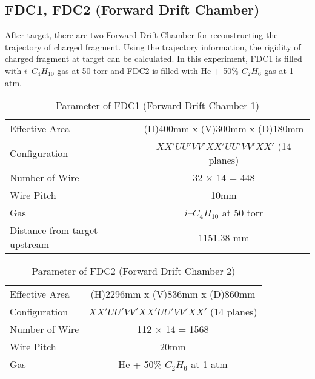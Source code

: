 \subsection{FDC1, FDC2 (Forward Drift Chamber)}
After target, there are two Forward Drift Chamber for reconstructing the trajectory of charged fragment. Using the trajectory information, the rigidity of charged fragment at target can be calculated. In this experiment, FDC1 is filled with $i$--${C}_{4} {H}_{10}$ gas at 50 torr and FDC2 is filled with He + 50\% ${C}_{2} {H}_{6}$ gas at 1 atm. 

\begin{table}[h]
    \centering
    \begin{tabular}{l|c}
        \hline
        Effective Area & (H)400mm x (V)300mm x (D)180mm\\
        Configuration & $XX'UU'VV'XX'UU'VV'XX'$ (14 planes)\\
        Number of Wire & 32 $\times$ 14 = 448 \\
        Wire Pitch & 10mm \\
        Gas & $i$--${C}_{4} {H}_{10}$ at 50 torr\\
        Distance from target upstream & 1151.38 mm  \\
        \hline
    \end{tabular}
    \caption{Parameter of FDC1 (Forward Drift Chamber 1) \cite{SAMURAI}}
\end{table}

\begin{table}[h]
    \centering
    \begin{tabular}{l|c}
        \hline
        Effective Area & (H)2296mm x (V)836mm x (D)860mm\\
        Configuration & $XX'UU'VV'XX'UU'VV'XX'$ (14 planes)\\
        Number of Wire & 112 $\times$ 14 = 1568 \\
        Wire Pitch & 20mm \\
        Gas & He + 50\% ${C}_{2} {H}_{6}$ at 1 atm\\
        \hline
    \end{tabular}
    \caption{Parameter of FDC2 (Forward Drift Chamber 2) \cite{SAMURAI}}
\end{table}

